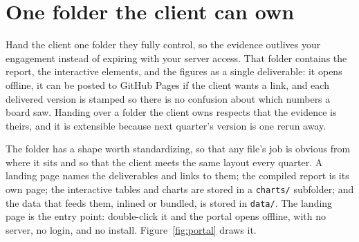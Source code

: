 \documentclass[
    a4paper,
    fontsize=10pt,
    twoside=true,
    numbers=noenddot,
]{kaobook}
\begin{document}
\section{One folder the client can own}
Hand the client one folder they fully control, so the evidence outlives your engagement instead of expiring with your server access. That folder contains the report, the interactive elements, and the figures as a single deliverable: it opens offline, it can be posted to GitHub Pages if the client wants a link, and each delivered version is stamped so there is no confusion about which numbers a board saw. Handing over a folder the client owns respects that the evidence is theirs, and it is extensible because next quarter's version is one rerun away.

The folder has a shape worth standardizing, so that any file's job is obvious from where it sits and so that the client meets the same layout every quarter. A landing page names the deliverables and links to them; the compiled report is its own page; the interactive tables and charts are stored in a \texttt{charts/} subfolder; and the data that feeds them, inlined or bundled, is stored in \texttt{data/}. The landing page is the entry point: double-click it and the portal opens offline, with no server, no login, and no install. Figure~\ref{fig:portal} draws it.
\end{document}
